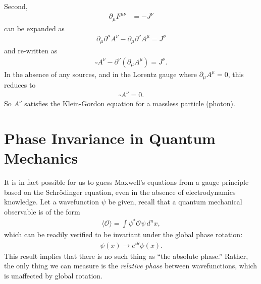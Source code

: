 \documentclass{book}
\numberwithin{equation}{section}
\theoremstyle{definition}
\newcommand{\p}{\partial}
\begin{document}
Second, 
\begin{align}
\p_\mu F^{\mu\nu} &= -J^\nu
\end{align}
can be expanded as
\begin{align}
\p_\mu \p^\mu A^\nu - \p_\mu \p^\nu A^\mu = J^\nu
\end{align}
and re-written as
\begin{align}
\square A^\nu - \p^\nu(\p_\mu A^\mu) = J^\nu.
\end{align}
In the absence of any sources, and in the Lorentz gauge where $\p_\mu A^\mu = 0$, this reduces to
\begin{align}
\square A^\nu = 0.
\end{align}
So $A^\nu$ satisfies the Klein-Gordon equation for a massless particle (photon). 


\section{Phase Invariance in Quantum Mechanics}
It is in fact possible for us to guess Maxwell's equations from a gauge principle based on the Schr\"odinger equation, even in the absence of electrodynamics knowledge. Let a wavefunction $\psi$ be given, recall that a quantum mechanical observable is of the form
\begin{align}
\langle \mathcal{O} \rangle = \int\psi^* \mathcal{O} \psi\, d^nx,
\end{align}
which can be readily verified to be invariant under the global phase rotation:
\begin{align}
\psi(x) \to e^{i\theta}\psi(x).
\end{align}
This result implies that there is no such thing as ``the absolute phase.'' Rather, the only thing we can measure is the \textit{relative phase} between wavefunctions, which is unaffected by global rotation.\\
\end{document}
